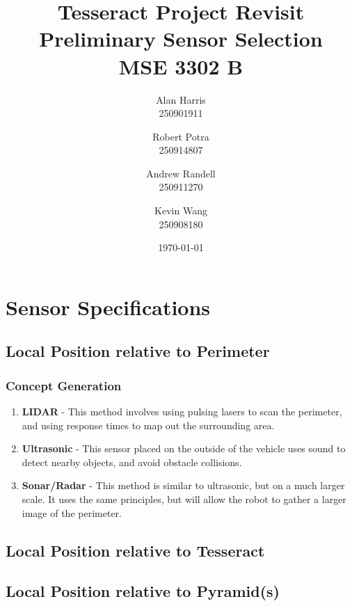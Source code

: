 \documentclass[12pt]{article}
\begin{document}
\title{\textbf{Tesseract Project Revisit\\Preliminary Sensor Selection\\ MSE 3302 B}}
\author{
  Alan Harris\\
  250901911
  \and
  Robert Potra\\
  250914807
  \and
  Andrew Randell\\
  250911270
  \and
  Kevin Wang\\
  250908180
}
\date{\today}
\maketitle

\tableofcontents
\thispagestyle{empty}

\pagebreak
\setcounter{page}{1}

\section{Sensor Specifications}
\subsection{Local Position relative to Perimeter}
\subsubsection{Concept Generation}

\begin{enumerate}
\item \textbf{LIDAR} - This method involves using pulsing lasers to scan the perimeter, and using response times to map out the surrounding area.

\item \textbf{Ultrasonic} - This sensor placed on the outside of the vehicle uses sound to detect nearby objects, and avoid obstacle collisions.

\item \textbf{Sonar/Radar} - This method is similar to ultrasonic, but on a much larger scale. It uses the same principles, but will allow the robot to gather a larger image of the perimeter.
\end{enumerate}


\subsection{Local Position relative to Tesseract}


\subsection{Local Position relative to Pyramid(s)}
\end{document}
